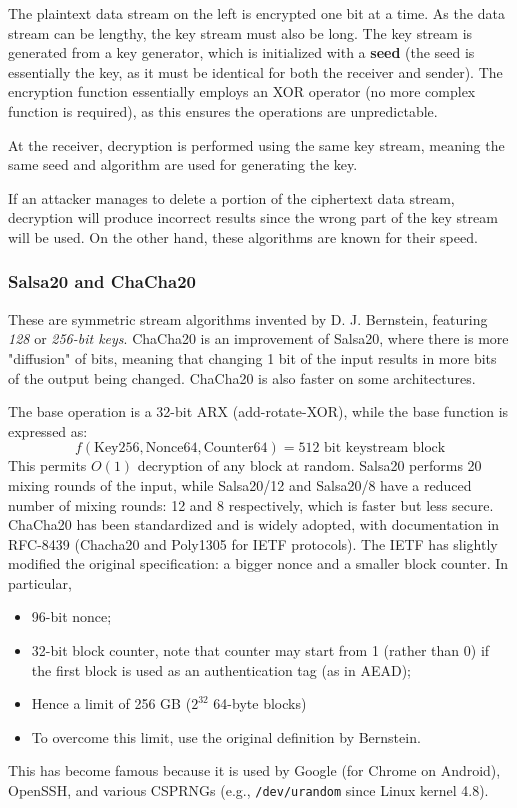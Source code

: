The plaintext data stream on the left is encrypted one bit at a time. As the data stream can be lengthy, the key stream must also be long. The key stream is generated from a key generator, which is initialized with a \textbf{seed} (the seed is essentially the key, as it must be identical for both the receiver and sender). The encryption function essentially employs an XOR operator (no more complex function is required), as this ensures the operations are unpredictable.

At the receiver, decryption is performed using the same key stream, meaning the same seed and algorithm are used for generating the key.

If an attacker manages to delete a portion of the ciphertext data stream, decryption will produce incorrect results since the wrong part of the key stream will be used. On the other hand, these algorithms are known for their speed.


\subsubsection{Salsa20 and ChaCha20}
These are symmetric stream algorithms invented by D. J. Bernstein, featuring \textit{128} or \textit{256-bit keys}. ChaCha20 is an improvement of Salsa20, where there is more "diffusion" of bits, meaning that changing 1 bit of the input results in more bits of the output being changed. ChaCha20 is also faster on some architectures.

The base operation is a 32-bit ARX (add-rotate-XOR), while the base function is expressed as:
\[ f(\text{{Key256}}, \text{{Nonce64}}, \text{{Counter64}}) = 512 \text{{ bit keystream block}} \]
This permits \(O(1)\) decryption of any block at random. Salsa20 performs 20 mixing rounds of the input, while
Salsa20/12 and Salsa20/8 have a reduced number of mixing rounds: 12 and 8 respectively, which is faster but
less secure.
ChaCha20 has been standardized and is widely adopted, with documentation in RFC-8439 (Chacha20 and
Poly1305 for IETF protocols). The IETF has slightly modified the original specification: a bigger nonce and
a smaller block counter. In particular,
\begin{itemize}
    \item 96-bit nonce;
    \item 32-bit block counter, note that counter may start from 1 (rather than 0) if the first block is used as an authentication tag (as in AEAD);
    \item Hence a limit of 256 GB ($2^{32} $ 64-byte blocks)
    \item To overcome this limit, use the original definition by Bernstein.
\end{itemize}
This has become famous because it is used by Google (for Chrome on Android), OpenSSH, and various CSPRNGs (e.g., \texttt{/dev/urandom} since Linux kernel 4.8).

